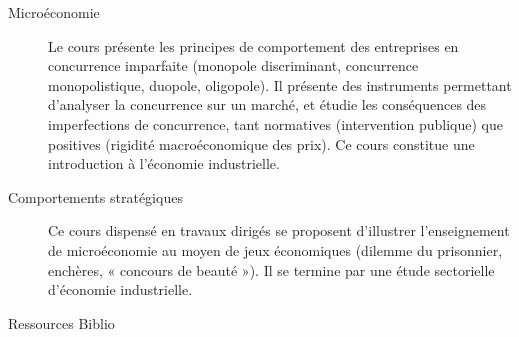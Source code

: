 {}
{
\begin{description}
\item[Microéconomie] Le cours présente les principes de comportement des entreprises en concurrence imparfaite (monopole discriminant, concurrence monopolistique, duopole, oligopole). Il présente des instruments permettant d'analyser la concurrence sur un marché, et étudie les conséquences des imperfections de concurrence, tant normatives (intervention publique) que positives (rigidité macroéconomique des prix). Ce cours constitue une introduction à l'économie industrielle.
\item[Comportements stratégiques] Ce cours dispensé en travaux dirigés se proposent d'illustrer l'enseignement de microéconomie au moyen de jeux économiques (dilemme du prisonnier, enchères, « concours de beauté »). Il se termine par une étude sectorielle d'économie industrielle.
\end{description}
}
{}
{Ressources} 
{Biblio} 
 
\vfill
